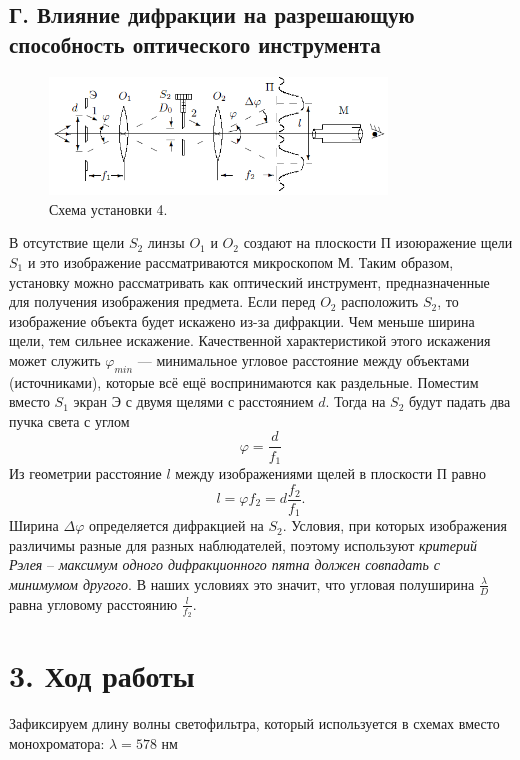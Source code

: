 \documentclass[a4paper,12pt]{report}
\begin{document}
\subsection*{Г. Влияние дифракции на разрешающую способность оптического инструмента}
\begin{figure}[H]
\includegraphics[width = 0.8\textwidth]{5.png}
\centering
\caption{Схема установки 4.}
\end{figure}
В отсутствие щели $S_2$ линзы $O_1$ и $O_2$ создают на плоскости П изоюражение щели $S_1$ и это изображение рассматриваются микроскопом М. Таким образом, установку можно рассматривать как оптический инструмент, предназначенные для получения изображения предмета. Если перед $O_2$ расположить $S_2$, то изображение объекта будет искажено из-за дифракции. Чем меньше ширина щели, тем сильнее искажение. Качественной характеристикой этого искажения может служить $\varphi_{min}$ --- минимальное угловое расстояние между объектами (источниками), которые всё ещё воспринимаются как раздельные. Поместим вместо $S_1$ экран Э с двумя щелями с расстоянием $d$. Тогда на $S_2$ будут падать два пучка света с углом
\begin{equation}
\varphi = \dfrac{d}{f_1}
\end{equation}
Из геометрии расстояние $l$ между изображениями щелей в плоскости П равно 
\begin{equation}
l = \varphi f_2 = d \dfrac{f_2}{f_1}.
\end{equation}
Ширина $\Delta \varphi$ определяется дифракцией на $S_2$. Условия, при которых изображения различимы разные для разных наблюдателей, поэтому используют \textit{критерий Рэлея} -- \textit{максимум одного дифракционного пятна должен совпадать с минимумом другого}. В наших условиях это значит, что угловая полуширина $\frac{\lambda}{D}$ равна угловому расстоянию $\frac{l}{f_2}$.

\section*{3. Ход работы}
Зафиксируем длину волны светофильтра, который используется в схемах вместо монохроматора:
$\lambda = 578$ нм
\end{document}
